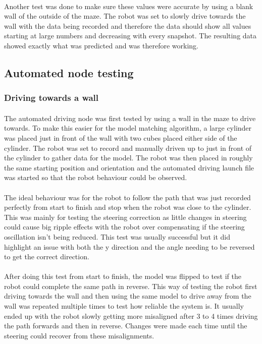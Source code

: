 \paragraph{}
Another test was done to make sure these values were accurate by using a blank wall of the outside of the maze. The robot was set to slowly drive towards the wall with the data being recorded and therefore the data should show all values starting at large numbers and decreasing with every snapshot. The resulting data showed exactly what was predicted and was therefore working.


\subsection{Automated node testing}
\subsubsection{Driving towards a wall}
\paragraph{}
The automated driving node was first tested by using a wall in the maze to drive towards. To make this easier for the model matching algorithm, a large cylinder was placed just in front of the wall with two cubes placed either side of the cylinder. The robot was set to record and manually driven up to just in front of the cylinder to gather data for the model. The robot was then placed in roughly the same starting position and orientation and the automated driving launch file was started so that the robot behaviour could be observed.

\paragraph{}
The ideal behaviour was for the robot to follow the path that was just recorded perfectly from start to finish and stop when the robot was close to the cylinder. This was mainly for testing the steering correction as little changes in steering could cause big ripple effects with the robot over compensating if the steering oscillation isn't being reduced. This test was usually successful but it did highlight an issue with both the y direction and the angle needing to be reversed to get the correct direction.

\paragraph{}
After doing this test from start to finish, the model was flipped to test if the robot could complete the same path in reverse. This way of testing the robot first driving towards the wall and then using the same model to drive away from the wall was repeated multiple times to test how reliable the system is. It usually ended up with the robot slowly getting more misaligned after 3 to 4 times driving the path forwards and then in reverse. Changes were made each time until the steering could recover from these misalignments.

